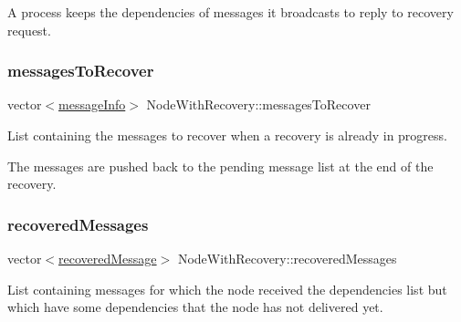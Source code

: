 A process keeps the dependencies of messages it broadcasts to reply to recovery request. 

\mbox{\label{class_node_with_recovery_a9ed4ac06c68ac579d7848a98b145b5ae}} 
\subsubsection{\texorpdfstring{messages\+To\+Recover}{messagesToRecover}}
{\footnotesize\ttfamily vector$<$\hyperlink{structures_8h_a7e7bdc1d2fff8a9436f2f352b2711ed6}{message\+Info}$>$ Node\+With\+Recovery\+::messages\+To\+Recover\hspace{0.3cm}{\ttfamily [protected]}}



List containing the messages to recover when a recovery is already in progress. 

The messages are pushed back to the pending message list at the end of the recovery. \mbox{\label{class_node_with_recovery_adf6b319a727cd9ec43a6cc68cbf99bbb}} 
\subsubsection{\texorpdfstring{recovered\+Messages}{recoveredMessages}}
{\footnotesize\ttfamily vector$<$\hyperlink{_node_with_recovery_8h_abc64f7ff8d329883ae93979292b1c996}{recovered\+Message}$>$ Node\+With\+Recovery\+::recovered\+Messages\hspace{0.3cm}{\ttfamily [protected]}}



List containing messages for which the node received the dependencies list but which have some dependencies that the node has not delivered yet. 

\mbox{\label{class_node_with_recovery_abaecd0d1b36ad0305c281905a3465dd6}} 
